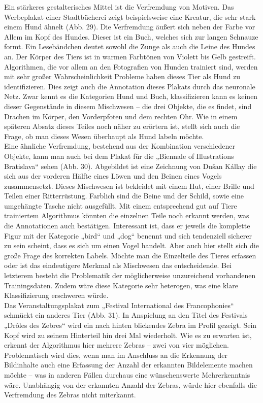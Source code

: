 \documentclass[a4paper,12pt,ngerman]{article}
\begin{document}
Ein stärkeres gestalterisches Mittel ist die Verfremdung von Motiven. Das Werbeplakat einer Stadtbücherei zeigt beispielsweise eine Kreatur, die sehr stark einem Hund ähnelt (Abb. 29). Die Verfremdung äußert sich neben der Farbe vor Allem im Kopf des Hundes. Dieser ist ein Buch, welches sich zur langen Schnauze formt. Ein Lesebändchen deutet sowohl die Zunge als auch die Leine des Hundes an. Der Körper des Tiers ist in warmen Farbtönen von Violett bis Gelb gestreift. Algorithmen, die vor allem an den Fotografien von Hunden trainiert sind, werden mit sehr großer Wahrscheinlichkeit Probleme haben dieses Tier als Hund zu identifizieren. Dies zeigt auch die Annotation dieses Plakats durch das neuronale Netz. Zwar kennt es die Kategorien Hund und Buch, klassifizieren kann es keinen dieser Gegenstände in diesem Mischwesen – die drei Objekte, die es findet, sind Drachen im Körper, den Vorderpfoten und dem rechten Ohr. Wie in einem späteren Absatz dieses Teiles noch näher zu erörtern ist, stellt sich auch die Frage, ob man dieses Wesen überhaupt als Hund labeln möchte. \\
Eine ähnliche Verfremdung, bestehend aus der Kombination verschiedener Objekte, kann man auch bei dem Plakat für die „Biennale of Illustrations Bratislava“ sehen (Abb. 30). Abgebildet ist eine Zeichnung von Dušan Kállay die sich aus der vorderen Hälfte eines Löwen und den Beinen eines Vogels zusammensetzt. Dieses Mischwesen ist bekleidet mit einem Hut, einer Brille und Teilen einer Ritterrüstung. Farblich sind die Beine und der Schild, sowie eine umgehängte Tasche nicht ausgefüllt. Mit einem entsprechend gut auf Tiere trainiertem Algorithmus könnten die einzelnen Teile noch erkannt werden, was die Annotationen auch bestätigen. Interessant ist, dass er jeweils die komplette Figur mit der Kategorie „bird“ und „dog“ benennt und sich tendenziell sicherer zu sein scheint, dass es sich um einen Vogel handelt. Aber auch hier stellt sich die große Frage des korrekten Labels. Möchte man die Einzelteile des Tieres erfassen oder ist das eindeutigere Merkmal als Mischwesen das entscheidende. Bei letzterem besteht die Problematik der möglicherweise unzureichend vorhandenen Trainingsdaten. Zudem wäre diese Kategorie sehr heterogen, was eine klare Klassifizierung erschweren würde. \\
Das Veranstaltungsplakat zum „Festival International des Francophonies“ schmückt ein anderes Tier (Abb. 31). In Anspielung an den Titel des Festivals „Drôles des Zebres“ wird ein nach hinten blickendes Zebra im Profil gezeigt. Sein Kopf wird zu seinem Hinterteil hin drei Mal wiederholt. Wie es zu erwarten ist, erkennt der Algorithmus hier mehrere Zebras – zwei von vier möglichen. Problematisch wird dies, wenn man im Anschluss an die Erkennung der Bildinhalte auch eine Erfassung der Anzahl der erkannten Bildelemente machen möchte – was in anderen Fällen durchaus eine wünschenswerte Mehrerkenntnis wäre. Unabhängig von der erkannten Anzahl der Zebras, würde hier ebenfalls die Verfremdung des Zebras nicht miterkannt. \\
\end{document}
